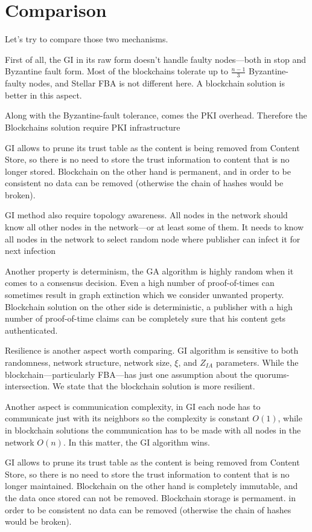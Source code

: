 
\chapter{Comparison}
Let's try to compare those two mechanisms. 

First of all, the GI in its raw form doesn't handle faulty nodes––both in stop and Byzantine fault form. Most of the blockchains tolerate up to $\frac{n-1}{3}$ Byzantine-faulty nodes, and Stellar FBA is not different here. A blockchain solution is better in this aspect.

Along with the Byzantine-fault tolerance, comes the PKI overhead. Therefore the Blockchains solution require PKI infrastructure

GI allows to prune its trust table as the content is being removed from Content Store, so there is no need to store the trust information to content that is no longer stored. Blockchain on the other hand is permanent, and in order to be consistent no data can be removed (otherwise the chain of hashes would be broken). 


GI method also require topology awareness. All nodes in the network should know all other nodes in the network––or at least some of them. It needs to know all nodes in the network to select random node where publisher can infect it for next infection


Another property is determinism, the GA algorithm is highly random when it comes to a consensus decision. Even a high number of proof-of-times can sometimes result in graph extinction which we consider unwanted property. Blockchain solution on the other side is deterministic, a publisher with a high number of proof-of-time claims can be completely sure that his content gets authenticated. 

Resilience is another aspect worth comparing. GI algorithm is sensitive to both randomness, network structure, network size, $\xi$, and $Z_{IA}$ parameters. While the blockchain––particularly FBA––has just one assumption about the quorums-intersection. We state that the blockchain solution is more resilient. 

Another aspect is communication complexity, in GI each node has to communicate just with its neighbors so the complexity is constant $O(1)$, while in blockchain solutions the communication has to be made with all nodes in the network $O(n)$. In this matter, the GI algorithm wins.

GI allows to prune its trust table as the content is being removed from Content Store, so there is no need to store the trust information to content that is no longer maintained. Blockchain on the other hand is completely immutable, and the data once stored can not be removed. Blockchain storage is permament. in order to be consistent no data can be removed (otherwise the chain of hashes would be broken). 




